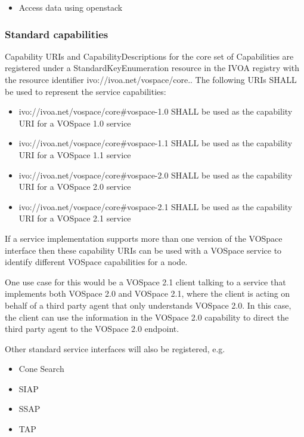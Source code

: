 \documentclass[11pt,a4paper]{ivoa}
\begin{document}
\begin{itemize}
    \item Access data using openstack
\end{itemize}

\subsubsection{Standard capabilities}
\label{subsubsec:standard capabilities}
Capability URIs and CapabilityDescriptions for the core set of Capabilities are registered under a StandardKeyEnumeration resource \citep{std:STDREGEXT} in the IVOA registry with the resource identifier ivo://ivoa.net/vospace/core.. The following URIs SHALL be used to represent the service capabilities:

\begin{itemize}
    \item ivo://ivoa.net/vospace/core\#vospace-1.0 SHALL be used as the capability URI for a VOSpace 1.0 service
    \item ivo://ivoa.net/vospace/core\#vospace-1.1 SHALL be used as the capability URI for a VOSpace 1.1 service
    \item ivo://ivoa.net/vospace/core\#vospace-2.0 SHALL be used as the capability URI for a VOSpace 2.0 service
    \item ivo://ivoa.net/vospace/core\#vospace-2.1 SHALL be used as the capability URI for a VOSpace 2.1 service
\end{itemize}
If a service implementation supports more than one version of the VOSpace interface then these capability URIs can be used with a VOSpace service to identify different VOSpace capabilities for a node.

One use case for this would be a VOSpace 2.1 client talking to a service that implements both VOSpace 2.0 and VOSpace 2.1, where the client is acting on behalf of a third party agent that only understands VOSpace 2.0. In this case, the client can use the information in the VOSpace 2.0 capability to direct the third party agent to the VOSpace 2.0 endpoint.

Other standard service interfaces will also be registered, e.g.

\begin{itemize}
    \item Cone Search
    \item SIAP
    \item SSAP
    \item TAP
\end{itemize}
\end{document}
